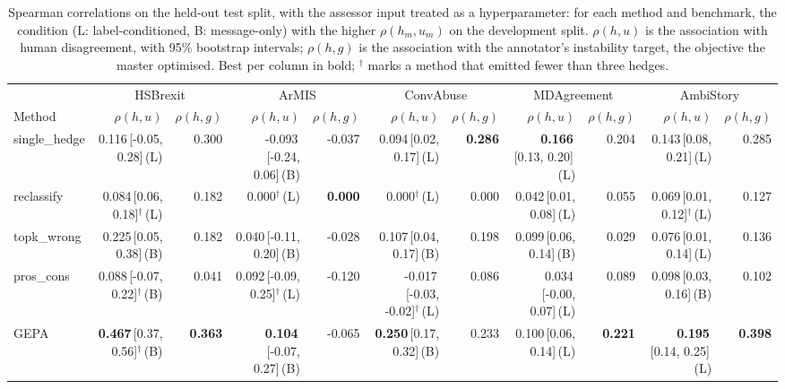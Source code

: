 \begin{table}[t]
\centering
\small
\begin{tabular}{lrrrrrrrrrr}
\hline
 & \multicolumn{2}{c}{HSBrexit} & \multicolumn{2}{c}{ArMIS} & \multicolumn{2}{c}{ConvAbuse} & \multicolumn{2}{c}{MDAgreement} & \multicolumn{2}{c}{AmbiStory} \\
Method & $\rho(h,u)$ & $\rho(h,g)$ & $\rho(h,u)$ & $\rho(h,g)$ & $\rho(h,u)$ & $\rho(h,g)$ & $\rho(h,u)$ & $\rho(h,g)$ & $\rho(h,u)$ & $\rho(h,g)$ \\
\hline
single\_hedge & 0.116{\scriptsize\,[-0.05, 0.28]}{\scriptsize\,(L)} & 0.300 & -0.093{\scriptsize\,[-0.24, 0.06]}{\scriptsize\,(B)} & -0.037 & 0.094{\scriptsize\,[0.02, 0.17]}{\scriptsize\,(L)} & \textbf{0.286} & \textbf{0.166}{\scriptsize\,[0.13, 0.20]}{\scriptsize\,(L)} & 0.204 & 0.143{\scriptsize\,[0.08, 0.21]}{\scriptsize\,(L)} & 0.285 \\
reclassify & 0.084{\scriptsize\,[0.06, 0.18]}$^\dagger${\scriptsize\,(L)} & 0.182 & 0.000$^\dagger${\scriptsize\,(L)} & \textbf{0.000} & 0.000$^\dagger${\scriptsize\,(L)} & 0.000 & 0.042{\scriptsize\,[0.01, 0.08]}{\scriptsize\,(L)} & 0.055 & 0.069{\scriptsize\,[0.01, 0.12]}$^\dagger${\scriptsize\,(L)} & 0.127 \\
topk\_wrong & 0.225{\scriptsize\,[0.05, 0.38]}{\scriptsize\,(B)} & 0.182 & 0.040{\scriptsize\,[-0.11, 0.20]}{\scriptsize\,(B)} & -0.028 & 0.107{\scriptsize\,[0.04, 0.17]}{\scriptsize\,(B)} & 0.198 & 0.099{\scriptsize\,[0.06, 0.14]}{\scriptsize\,(B)} & 0.029 & 0.076{\scriptsize\,[0.01, 0.14]}{\scriptsize\,(L)} & 0.136 \\
pros\_cons & 0.088{\scriptsize\,[-0.07, 0.22]}$^\dagger${\scriptsize\,(B)} & 0.041 & 0.092{\scriptsize\,[-0.09, 0.25]}$^\dagger${\scriptsize\,(L)} & -0.120 & -0.017{\scriptsize\,[-0.03, -0.02]}$^\dagger${\scriptsize\,(L)} & 0.086 & 0.034{\scriptsize\,[-0.00, 0.07]}{\scriptsize\,(L)} & 0.089 & 0.098{\scriptsize\,[0.03, 0.16]}{\scriptsize\,(B)} & 0.102 \\
GEPA & \textbf{0.467}{\scriptsize\,[0.37, 0.56]}$^\dagger${\scriptsize\,(B)} & \textbf{0.363} & \textbf{0.104}{\scriptsize\,[-0.07, 0.27]}{\scriptsize\,(B)} & -0.065 & \textbf{0.250}{\scriptsize\,[0.17, 0.32]}{\scriptsize\,(B)} & 0.233 & 0.100{\scriptsize\,[0.06, 0.14]}{\scriptsize\,(L)} & \textbf{0.221} & \textbf{0.195}{\scriptsize\,[0.14, 0.25]}{\scriptsize\,(L)} & \textbf{0.398} \\
\hline
\end{tabular}
\caption{Spearman correlations on the held-out test split, with the assessor input treated as a hyperparameter: for each method and benchmark, the condition (L: label-conditioned, B: message-only) with the higher $\rho(h_m,u_m)$ on the development split. $\rho(h,u)$ is the association with human disagreement, with 95\% bootstrap intervals; $\rho(h,g)$ is the association with the annotator's instability target, the objective the master optimised. Best per column in bold; $^\dagger$ marks a method that emitted fewer than three hedges.}
\label{tab:selected}
\end{table}